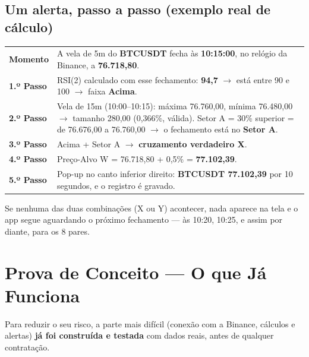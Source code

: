 \documentclass[11pt,a4paper]{article}
\begin{document}
\subsection{Um alerta, passo a passo (exemplo real de cálculo)}

\begin{center}
\small
\renewcommand{\arraystretch}{1.3}
\begin{tabularx}{\textwidth}{@{}>{\bfseries\leavevmode\color{navymid}}p{27mm} X@{}}
  \toprule
  Momento   & A vela de 5m do \textbf{BTCUSDT} fecha às \textbf{10:15:00}, no relógio da Binance, a \textbf{76.718,80}. \\
  1.º Passo & RSI(2) calculado com esse fechamento: \textbf{94,7} $\rightarrow$ está entre 90 e 100 $\rightarrow$ faixa \textbf{Acima}. \\
  2.º Passo & Vela de 15m (10:00--10:15): máxima 76.760,00, mínima 76.480,00 $\rightarrow$ tamanho 280,00 (0,366\%, válida).
              Setor A = 30\% superior = de 76.676,00 a 76.760,00 $\rightarrow$ o fechamento está no \textbf{Setor A}. \\
  3.º Passo & Acima + Setor A $\rightarrow$ \textbf{cruzamento verdadeiro X}. \\
  4.º Passo & Preço-Alvo W = 76.718,80 + 0,5\% = \textbf{\textcolor{sinalW}{77.102,39}}. \\
  5.º Passo & Pop-up no canto inferior direito: \textbf{BTCUSDT \textcolor{sinalW}{77.102,39}} por 10 segundos, e o registro é gravado. \\
  \bottomrule
\end{tabularx}
\end{center}

Se nenhuma das duas combinações (X ou Y) acontecer, nada aparece na tela e o app segue
aguardando o próximo fechamento --- às 10:20, 10:25, e assim por diante, para os 8 pares.

\section{Prova de Conceito --- O que Já Funciona}

Para reduzir o seu risco, a parte mais difícil (conexão com a Binance, cálculos e alertas)
\textbf{já foi construída e testada} com dados reais, antes de qualquer contratação.
\end{document}

